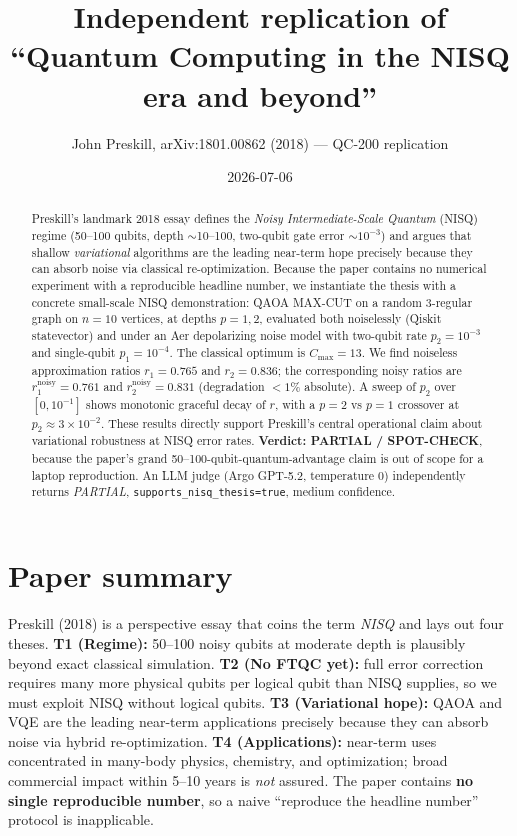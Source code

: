 \documentclass[11pt]{article}
\title{Independent replication of \\
       ``Quantum Computing in the NISQ era and beyond''}
\author{John Preskill, arXiv:1801.00862 (2018) --- QC-200 replication}
\date{2026-07-06}
\begin{document}
\maketitle

\begin{abstract}
Preskill's landmark 2018 essay defines the \emph{Noisy Intermediate-Scale Quantum} (NISQ)
regime (50--100 qubits, depth $\sim$10--100, two-qubit gate error $\sim 10^{-3}$)
and argues that shallow \emph{variational} algorithms are the leading near-term hope
precisely because they can absorb noise via classical re-optimization. Because the paper
contains no numerical experiment with a reproducible headline number, we instantiate the
thesis with a concrete small-scale NISQ demonstration: QAOA MAX-CUT on a random
3-regular graph on $n=10$ vertices, at depths $p{=}1,2$, evaluated both noiselessly
(Qiskit statevector) and under an Aer depolarizing noise model with two-qubit rate
$p_2 = 10^{-3}$ and single-qubit $p_1 = 10^{-4}$. The classical optimum is
$C_{\max} = 13$. We find noiseless approximation ratios $r_1 = 0.765$ and
$r_2 = 0.836$; the corresponding noisy ratios are $r_1^{\text{noisy}} = 0.761$
and $r_2^{\text{noisy}} = 0.831$ (degradation $<1\%$ absolute). A sweep of $p_2$
over $[0, 10^{-1}]$ shows monotonic graceful decay of $r$, with a $p{=}2$ vs
$p{=}1$ crossover at $p_2 \approx 3\times 10^{-2}$. These results directly support
Preskill's central operational claim about variational robustness at NISQ error
rates. \textbf{Verdict: PARTIAL / SPOT-CHECK}, because the paper's grand
50--100-qubit-quantum-advantage claim is out of scope for a laptop reproduction.
An LLM judge (Argo GPT-5.2, temperature 0) independently returns
\emph{PARTIAL}, \texttt{supports\_nisq\_thesis=true}, medium confidence.
\end{abstract}

\section{Paper summary}

Preskill (2018) is a perspective essay that coins the term \emph{NISQ} and lays
out four theses. \textbf{T1 (Regime):} 50--100 noisy qubits at moderate depth is
plausibly beyond exact classical simulation. \textbf{T2 (No FTQC yet):} full
error correction requires many more physical qubits per logical qubit than NISQ
supplies, so we must exploit NISQ without logical qubits. \textbf{T3 (Variational
hope):} QAOA and VQE are the leading near-term applications precisely because
they can absorb noise via hybrid re-optimization. \textbf{T4 (Applications):}
near-term uses concentrated in many-body physics, chemistry, and optimization;
broad commercial impact within 5--10 years is \emph{not} assured. The paper
contains \textbf{no single reproducible number}, so a naive ``reproduce the
headline number'' protocol is inapplicable.
\end{document}
